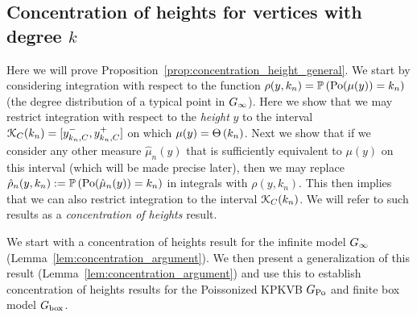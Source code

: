 \begin{appendices}
%

\section{Concentration of heights for vertices with degree \texorpdfstring{$k$}{k}}\label{sec:concentration_argument}

Here we will prove Proposition~\ref{prop:concentration_height_general}. We start by considering integration with respect to the function $\rho(y,k_n) = \mathbb{P}\left({\mathrm{Po}}(\mu(y)) = k_n\right)$ (the degree distribution of a typical point in $G_{\infty}$). Here we show that we may restrict integration with respect to the \emph{height} $y$ to the interval ${\mathcal K}_C(k_n) = [y_{k_n,C}^-, y_{k_n,C}^+]$ on which $\mu(y) = \Theta\left(k_n\right)$. Next we show that if we consider any other measure $\hat{\mu}_n(y)$ that is sufficiently equivalent to $\mu(y)$ on this interval (which will be made precise later), then we may replace $\hat{\rho}_n(y,k_n) := \mathbb{P}\left({\mathrm{Po}}(\hat{\mu}_n(y)) = k_n\right)$ in integrals with $\rho(y,k_n)$. This then implies that we can also restrict integration to the interval ${\mathcal K}_C(k_n)$. We will refer to such results as a \emph{concentration of heights} result.

We start with a concentration of heights result for the infinite model $G_{\infty}$ (Lemma~\ref{lem:concentration_argument}). We then present a generalization of this result (Lemma~\ref{lem:concentration_argument}) and use this to establish concentration of heights results for the Poissonized KPKVB $G_{{\mathrm{Po}}}$ and finite box model $G_{\mathrm{box}}$. 


\end{appendices}
